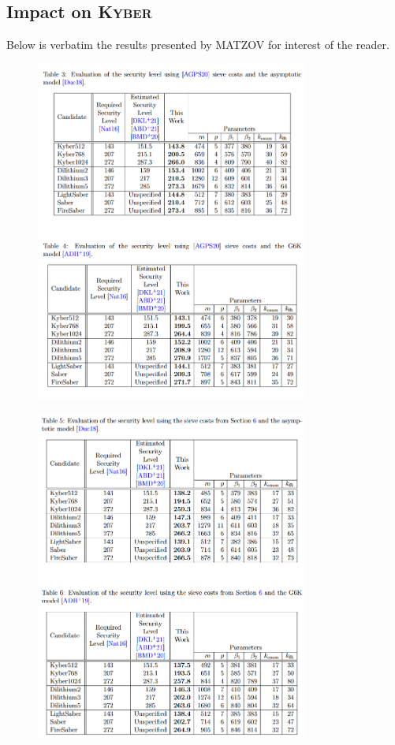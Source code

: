 \documentclass[a4paper, 10pt]{article}
\theoremstyle{definition}
\begin{document}
\newpage

\subsection{Impact on \textsc{Kyber}}

Below is verbatim the results presented by MATZOV \cite{matzov_2022_6412487} for interest of the reader.

\begin{figure}[H]
    \centering
    \includegraphics[width=0.8\textwidth]{matzov_results_1.png}
\end{figure}

\begin{figure}[H]
    \centering
    \includegraphics[width=0.8\textwidth]{matzov_results_2.png}
\end{figure}
\end{document}

